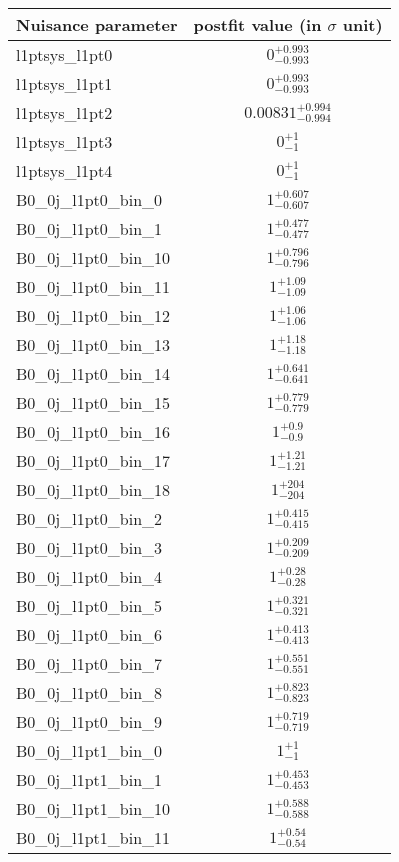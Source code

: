 
\begin{tabular}{|l|c|}
\hline
Nuisance parameter & postfit value (in $\sigma$ unit) \\\hline
l1ptsys\_l1pt0 & $0^{+0.993}_{-0.993}$ \\
l1ptsys\_l1pt1 & $0^{+0.993}_{-0.993}$ \\
l1ptsys\_l1pt2 & $0.00831^{+0.994}_{-0.994}$ \\
l1ptsys\_l1pt3 & $0^{+1}_{-1}$ \\
l1ptsys\_l1pt4 & $0^{+1}_{-1}$ \\
B0\_0j\_l1pt0\_bin\_0 & $1^{+0.607}_{-0.607}$ \\
B0\_0j\_l1pt0\_bin\_1 & $1^{+0.477}_{-0.477}$ \\
B0\_0j\_l1pt0\_bin\_10 & $1^{+0.796}_{-0.796}$ \\
B0\_0j\_l1pt0\_bin\_11 & $1^{+1.09}_{-1.09}$ \\
B0\_0j\_l1pt0\_bin\_12 & $1^{+1.06}_{-1.06}$ \\
B0\_0j\_l1pt0\_bin\_13 & $1^{+1.18}_{-1.18}$ \\
B0\_0j\_l1pt0\_bin\_14 & $1^{+0.641}_{-0.641}$ \\
B0\_0j\_l1pt0\_bin\_15 & $1^{+0.779}_{-0.779}$ \\
B0\_0j\_l1pt0\_bin\_16 & $1^{+0.9}_{-0.9}$ \\
B0\_0j\_l1pt0\_bin\_17 & $1^{+1.21}_{-1.21}$ \\
B0\_0j\_l1pt0\_bin\_18 & $1^{+204}_{-204}$ \\
B0\_0j\_l1pt0\_bin\_2 & $1^{+0.415}_{-0.415}$ \\
B0\_0j\_l1pt0\_bin\_3 & $1^{+0.209}_{-0.209}$ \\
B0\_0j\_l1pt0\_bin\_4 & $1^{+0.28}_{-0.28}$ \\
B0\_0j\_l1pt0\_bin\_5 & $1^{+0.321}_{-0.321}$ \\
B0\_0j\_l1pt0\_bin\_6 & $1^{+0.413}_{-0.413}$ \\
B0\_0j\_l1pt0\_bin\_7 & $1^{+0.551}_{-0.551}$ \\
B0\_0j\_l1pt0\_bin\_8 & $1^{+0.823}_{-0.823}$ \\
B0\_0j\_l1pt0\_bin\_9 & $1^{+0.719}_{-0.719}$ \\
B0\_0j\_l1pt1\_bin\_0 & $1^{+1}_{-1}$ \\
B0\_0j\_l1pt1\_bin\_1 & $1^{+0.453}_{-0.453}$ \\
B0\_0j\_l1pt1\_bin\_10 & $1^{+0.588}_{-0.588}$ \\
B0\_0j\_l1pt1\_bin\_11 & $1^{+0.54}_{-0.54}$ \\

\end{tabular}
